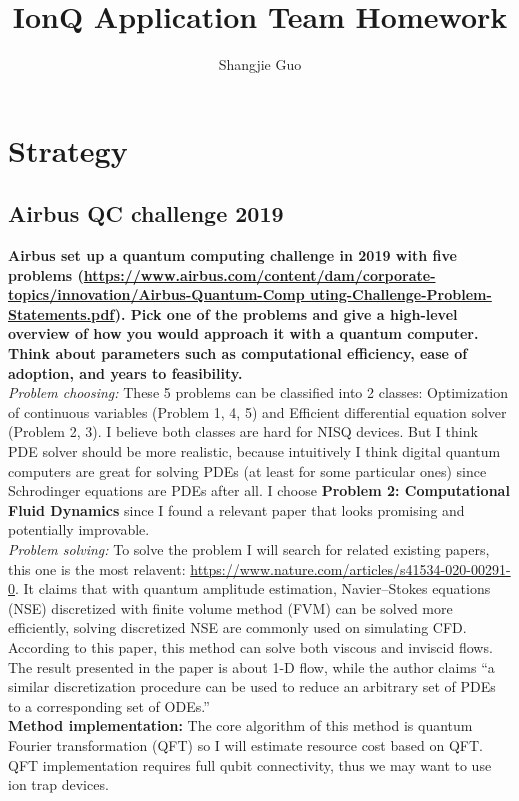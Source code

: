 \documentclass{article}
\title{IonQ Application Team Homework}
\author{Shangjie Guo}
\begin{document}
\maketitle

\section{Strategy}

\subsection{Airbus QC challenge 2019}
\textbf{Airbus set up a quantum computing challenge in 2019 with five problems (\url{https://www.airbus.com/content/dam/corporate-topics/innovation/Airbus-Quantum-Comp uting-Challenge-Problem-Statements.pdf}). Pick one of the problems and give a high-level overview of how you would approach it with a quantum computer. Think about parameters such as computational efficiency, ease of adoption, and years to feasibility.}\\

\noindent \textit{Problem choosing:} These 5 problems can be classified into 2 classes: Optimization of continuous variables (Problem 1, 4, 5) and Efficient differential equation solver (Problem 2, 3). I believe both classes are hard for NISQ devices. But I think PDE solver should be more realistic, because intuitively I think digital quantum computers are great for solving PDEs (at least for some particular ones) since Schrodinger equations are PDEs after all. I choose \textbf{Problem 2: Computational Fluid Dynamics} since I found a relevant paper that looks promising and potentially improvable.\\

\noindent \textit{Problem solving:} To solve the problem I will search for related existing papers, this one is the most relavent: \url{https://www.nature.com/articles/s41534-020-00291-0}. It claims that with quantum amplitude estimation,  Navier–Stokes equations (NSE) discretized with finite volume method (FVM) can be solved more efficiently, solving discretized NSE  are commonly used on simulating CFD. According to this paper, this method can solve both viscous and inviscid flows. The result presented in the paper is about 1-D flow, while the author claims ``a similar discretization procedure can be used to reduce an arbitrary set of PDEs to a corresponding
set of ODEs.''\\

\textbf{Method implementation: 
}
The core algorithm of this method is quantum Fourier transformation (QFT) so I will estimate resource cost based on QFT. QFT implementation requires full qubit connectivity, thus we may want to use ion trap devices. 
\end{document}
